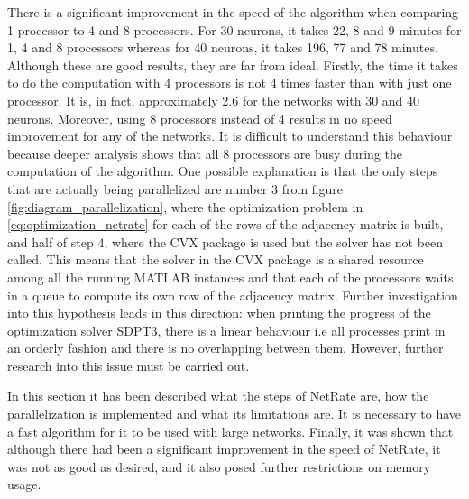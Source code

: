 \documentclass[11pt]{article}
\begin{document}
There is a significant improvement in the speed of the algorithm when comparing 1 processor to 4 and 8 processors. For 30 neurons, it takes 22, 8 and 9 minutes for 1, 4 and 8 processors whereas for 40 neurons, it takes 196, 77 and 78 minutes. Although these are good results, they are far from ideal. 
Firstly, the time it takes to do the computation with 4 processors is not 4 times faster than with just one processor. It is, in fact, approximately 2.6 for the networks with 30 and 40 neurons. 
Moreover, using 8 processors instead of 4 results in no speed improvement for any of the networks. It is difficult to understand this behaviour because deeper analysis shows that all 8 processors are busy during the computation of the algorithm. One possible explanation is that the only steps that are actually being parallelized are number 3 from figure \ref{fig:diagram_parallelization}, where the optimization problem in \ref{eq:optimization_netrate} for each of the rows of the adjacency matrix is built, and half of step 4, where the CVX package is used but the solver has not been called. This means that the solver in the CVX package is a shared resource among all the running MATLAB instances and that each of the processors waits in a queue to compute its own row of the adjacency matrix. Further investigation into this hypothesis leads in this direction: when printing the progress of the optimization solver SDPT3, there is a linear behaviour i.e all processes print in an orderly fashion and there is no overlapping between them. However, further research into this issue must be carried out.

In this section it has been described what the steps of NetRate are, how the parallelization is implemented and what its limitations are. It is necessary to have a fast algorithm for it to be used with large networks. Finally, it was shown that although there had been a significant improvement in the speed of NetRate, it was not as good as desired, and it also posed further restrictions on memory usage.  
\newpage
\printbibliography 
\end{document}
